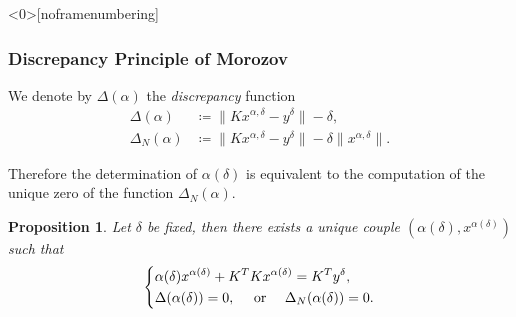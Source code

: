\documentclass[10pt,xcolor={dvipsnames}]{beamer}
\newtheorem{proposition}[subsection]{Proposition}
\theoremstyle{plain}
\theoremstyle{plain}
\begin{document}
\begin{frame}<0>[noframenumbering]
 \frametitle{Discrepancy Principle of Morozov}
 \begin{definition}
 We denote by $\Delta(\alpha)$ the \emph{discrepancy} function
 \begin{align}
  \Delta(\alpha)&\coloneqq\|Kx^{\alpha,\delta} - y^\delta\| - \delta, \label{eq:def-disc}\\
  \Delta_N(\alpha)&\coloneqq\|Kx^{\alpha,\delta} - y^\delta\| - \delta\|x^{\alpha,\delta}\|.\label{eq:def-disc-N}
 \end{align}
\end{definition}
Therefore the determination of $\alpha(\delta)$ is equivalent to the computation 
of the unique zero of the function $\Delta_N(\alpha)$.
\begin{proposition}
\label{prop:strategy-disc}
 Let $\delta$ be fixed, then there exists a unique 
 couple $(\alpha(\delta), x^{\alpha(\delta)})$ such that
 \begin{equation}
  \left\{
  \begin{split}
   & \alpha(\delta) x^{\alpha(\delta)} + K^TKx^{\alpha(\delta)} = K^Ty^\delta, \\
   & \Delta(\alpha(\delta))=0, \quad\textup{ or }\quad \Delta_N(\alpha(\delta))=0.
  \end{split}
  \right.
 \end{equation}
\end{proposition}
\end{frame}
\end{document}
